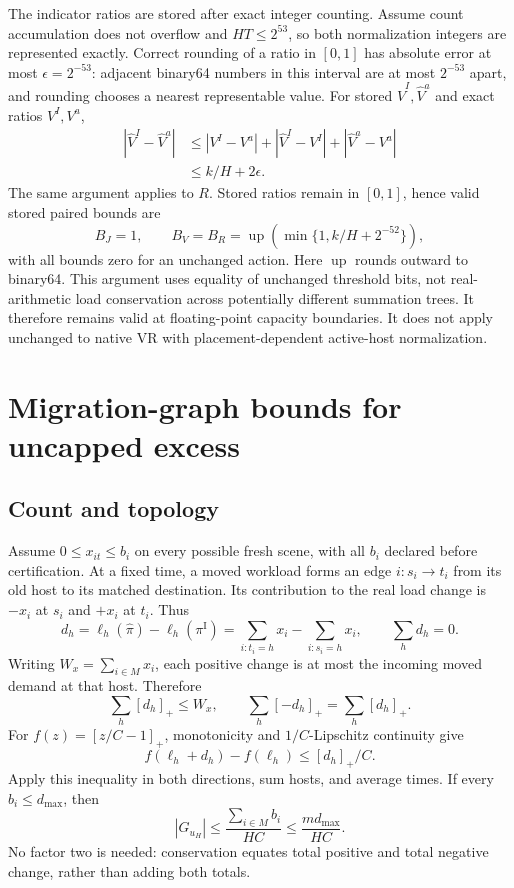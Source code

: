 \documentclass[11pt]{article}
\newcommand{\inc}{\pi^{\mathrm I}}
\newcommand{\act}{\widehat\pi}
\newcommand{\up}{\operatorname{up}}
\begin{document}
The indicator ratios are stored after exact integer counting. Assume count accumulation does not overflow and $HT\le2^{53}$, so both normalization integers are represented exactly. Correct rounding of a ratio in $[0,1]$ has absolute error at most $\epsilon=2^{-53}$: adjacent binary64 numbers in this interval are at most $2^{-53}$ apart, and rounding chooses a nearest representable value. For stored $\widehat V^I,\widehat V^a$ and exact ratios $V^I,V^a$,
\begin{align}
 |\widehat V^I-\widehat V^a|&\le |V^I-V^a|+|\widehat V^I-V^I|+|\widehat V^a-V^a|\\
 &\le k/H+2\epsilon.
\end{align}
The same argument applies to $R$. Stored ratios remain in $[0,1]$, hence valid stored paired bounds are
\begin{equation}
 B_J=1,\qquad B_V=B_R=\up\!\left(\min\{1,k/H+2^{-52}\}\right),
 \label{eq:footprint-bounds}
\end{equation}
with all bounds zero for an unchanged action. Here $\up$ rounds outward to binary64. This argument uses equality of unchanged threshold bits, not real-arithmetic load conservation across potentially different summation trees. It therefore remains valid at floating-point capacity boundaries. It does not apply unchanged to native VR with placement-dependent active-host normalization.

\section{Migration-graph bounds for uncapped excess}
\subsection{Count and topology}
Assume $0\le x_{it}\le b_i$ on every possible fresh scene, with all $b_i$ declared before certification. At a fixed time, a moved workload forms an edge $i:s_i\to t_i$ from its old host to its matched destination. Its contribution to the real load change is $-x_i$ at $s_i$ and $+x_i$ at $t_i$. Thus
\begin{equation}
 d_h=\ell_h(\act)-\ell_h(\inc)=\sum_{i:t_i=h}x_i-\sum_{i:s_i=h}x_i,\qquad \sum_hd_h=0.
\end{equation}
Writing $W_x=\sum_{i\in M}x_i$, each positive change is at most the incoming moved demand at that host. Therefore
\begin{equation}
 \sum_h[d_h]_+\le W_x,\qquad \sum_h[-d_h]_+=\sum_h[d_h]_+.
\end{equation}
For $f(z)=[z/C-1]_+$, monotonicity and $1/C$-Lipschitz continuity give
\begin{equation}
 f(\ell_h+d_h)-f(\ell_h)\le[d_h]_+/C.
 \label{eq:positive-lipschitz}
\end{equation}
Apply this inequality in both directions, sum hosts, and average times. If every $b_i\le d_{\max}$, then
\begin{equation}
 |G_{u_H}|\le\frac{\sum_{i\in M}b_i}{HC}\le\frac{m d_{\max}}{HC}.
 \label{eq:count-bound}
\end{equation}
No factor two is needed: conservation equates total positive and total negative change, rather than adding both totals.
\end{document}
